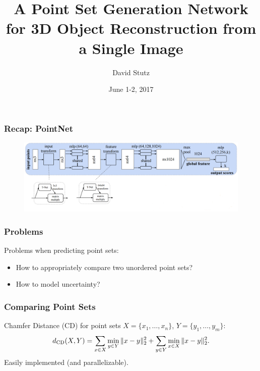 \documentclass[14pt]{beamer}
\title{A Point Set Generation Network for 3D Object Reconstruction from a Single Image \cite{Fan:2016}}
\author{David Stutz}
\date{June 1-2, 2017}
\begin{document}
  \begin{frame}[plain]
    \titlepage
  \end{frame}

  
  \begin{frame}
    \frametitle{Recap: PointNet}
    
    \begin{figure}
      \hspace*{-0.5cm}\includegraphics[scale=0.3]{classification_network}
    \end{figure}  
  \end{frame}
  
  \begin{frame}
    \frametitle{Problems}
    
    Problems when predicting point sets:
    \begin{itemize}
      \item How to appropriately compare two unordered point sets?
      \item How to model uncertainty?
    \end{itemize}
  \end{frame}
  
  \begin{frame}
    \frametitle{Comparing Point Sets}
    Chamfer Distance (CD) for point sets $X = \{x_1, \ldots,x_n\}$, $Y = \{y_1,\ldots,y_m\}$:
    \begin{align}
      d_{\text{CD}}(X, Y) = \sum_{x \in X} \min_{y \in Y} \|x - y\|_2^2 + \sum_{y \in Y}\min_{x \in X} \|x - y\|_2^2.\notag
    \end{align}    
    Easily implemented (and parallelizable).
  \end{frame}
  
\end{document}
